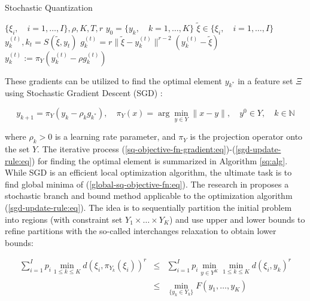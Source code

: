 \begin{algorithm}
    \caption{Stochastic Quantization}\label{sq:alg}
    \begin{algorithmic}[1]
    \Require $ \{ \xi_i, \quad i = 1, \ldots, I \}, \rho, K, T, r $
    \State $ y_0 = \{ y_k, \quad k = 1, \ldots, K \} $ 
        \State $ \tilde{\xi} \in \{ \xi_i, \quad i = 1, \ldots, I \} $ 
        \State $ y_k^{(t)}, k_t = S(\tilde{\xi}, y_t) $ 
        \State $ g_k^{(t)} = r \| \tilde{\xi} - y_k^{(t)} \|^{r - 2} (y_k^{(t)} - \tilde{\xi}) $ 
        \State $ y_k^{(t)} := \pi_Y (y_k^{(t)} - \rho g_k^{(t)}) $ 
    \EndFor
    \end{algorithmic}
\end{algorithm}

These gradients can be utilized to find the optimal element $y_{k^*}$ in a feature set $\Xi$ using Stochastic Gradient Descent (SGD) \cite{ermoliev1976stochastic,kiefer1952stochastic,Norkin_Kozyriev_Norkin_2024,Robbins_Monro_1951}:

\begin{equation}
    \label{sgd-update-rule:eq}
        y_{k+1} = \pi_Y (y_k - \rho_k g_{k^*}), \quad \pi_Y (x) = \arg \min_{y \in Y} \| x - y\|, \quad y^0 \in Y, \quad k \in \mathbb{N}
\end{equation}

\noindent where $\rho_k > 0$ is a learning rate parameter, and $\pi_Y$ is the projection operator onto the set $Y$. The iterative process (\ref{sq-objective-fn-gradient:eq})-(\ref{sgd-update-rule:eq}) for finding the optimal element is summarized in Algorithm \ref{sq:alg}. While SGD is an efficient local optimization algorithm, the ultimate task is to find global minima of (\ref{global-sq-objective-fn:eq}). The research in \cite{Norkin_Pflug_Ruszczynski_1998} proposes a stochastic branch and bound method applicable to the optimization algorithm (\ref{sgd-update-rule:eq}). The idea is to sequentially partition the initial problem into regions (with constraint set $Y_1 \times \ldots \times Y_K$) and use upper and lower bounds to refine partitions with the so-called interchanges relaxation to obtain lower bounds:

\begin{eqnarray}
    \label{sq-branch-bound:eq}
        \sum_{i=1}^I p_i \min_{1 \leq k \leq K} d(\xi_i, \pi_{Y_k} (\xi_i))^r
        &\leq& \sum_{i=1}^I p_i \min_{y \in Y^K} \min_{1 \leq k \leq K} d(\xi_i, y_k)^r \nonumber \\
        &\leq& \min_{\{ y_k \in Y_k \}} F(y_1, \ldots, y_K)
\end{eqnarray}

